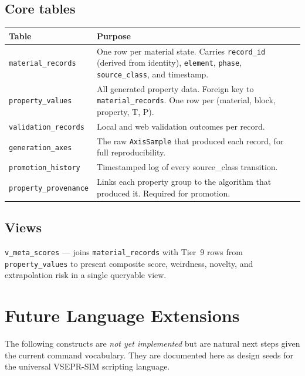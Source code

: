 \documentclass[11pt,letterpaper]{article}
\begin{document}
\subsection{Core tables}

\begin{center}
\begin{longtable}{lp{9cm}}
\toprule
Table & Purpose \\
\midrule
\texttt{material\_records}   & One row per material state.  Carries
							   \texttt{record\_id} (derived from identity),
							   \texttt{element}, \texttt{phase},
							   \texttt{source\_class}, and timestamp. \\
\texttt{property\_values}    & All generated property data.  Foreign key
							   to \texttt{material\_records}.  One row per
							   (material, block, property, T, P). \\
\texttt{validation\_records} & Local and web validation outcomes per record. \\
\texttt{generation\_axes}    & The raw \texttt{AxisSample} that produced
							   each record, for full reproducibility. \\
\texttt{promotion\_history}  & Timestamped log of every source\_class
							   transition. \\
\texttt{property\_provenance}& Links each property group to the algorithm
							   that produced it.  Required for promotion. \\
\bottomrule
\end{longtable}
\end{center}

\subsection{Views}

\texttt{v\_meta\_scores} --- joins \texttt{material\_records} with Tier~9
rows from \texttt{property\_values} to present composite score, weirdness,
novelty, and extrapolation risk in a single queryable view.

\section{Future Language Extensions}

The following constructs are \emph{not yet implemented} but are natural
next steps given the current command vocabulary.  They are documented here
as design seeds for the universal VSEPR-SIM scripting language.
\end{document}
